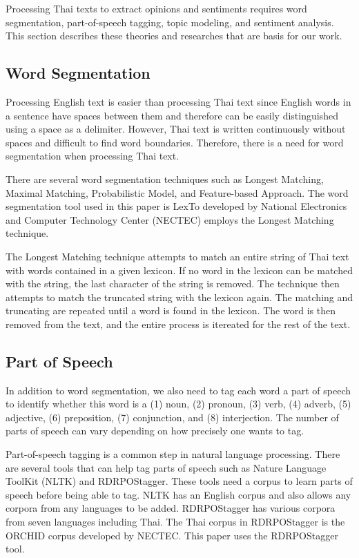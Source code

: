 Processing Thai texts to extract opinions and sentiments requires word segmentation, part-of-speech tagging, topic modeling, and sentiment analysis. This section describes these theories and researches that are basis for our work. 

\subsection{Word Segmentation}

Processing English text is easier than processing Thai text since English words in a sentence have spaces between them and therefore can be easily distinguished using a space as a delimiter. However, Thai text is written continuously without spaces and difficult to find word boundaries. Therefore, there is a need for word segmentation when processing Thai text.

There are several word segmentation techniques such as Longest Matching\cite{syllableseparator}, Maximal Matching\cite{wordsegforthai}, Probabilistic Model\cite{thaiwordfilter}, and Feature-based Approach\cite{featurethaiwordseg}. The word segmentation tool used in this paper is LexTo\cite{LexTo} developed by National Electronics and Computer Technology Center (NECTEC) employs the Longest Matching technique. 

The Longest Matching technique attempts to match an entire string of Thai text with words contained in a given lexicon. If no word in the lexicon can be matched with the string, the last character of the string is removed. The technique then attempts to match the truncated string with the lexicon again. The matching and truncating are repeated until a word is found in the lexicon. The word is then removed from the text, 
and the entire process is itereated for the rest of the text.

\subsection{Part of Speech}

In addition to word segmentation, we also need to tag each word a part of speech to identify whether this word is a (1) noun, (2) pronoun, (3) verb, (4) adverb, (5) adjective, (6) preposition, (7) conjunction, and (8) interjection. The number of parts of speech can vary depending on how precisely one wants to tag.

Part-of-speech tagging is a common step in natural language processing. There are several tools that can help tag parts of speech such as Nature Language ToolKit (NLTK)\cite{NLTK} and RDRPOStagger\cite{RDRPOSTagger}. These tools need a corpus to learn parts of speech before being able to tag. NLTK has an English corpus and also allows any corpora from any languages to be added. RDRPOStagger has various corpora from seven languages including Thai. The Thai corpus in RDRPOStagger is the ORCHID\cite{ORCHID} corpus developed by NECTEC. This paper uses the RDRPOStagger tool.

